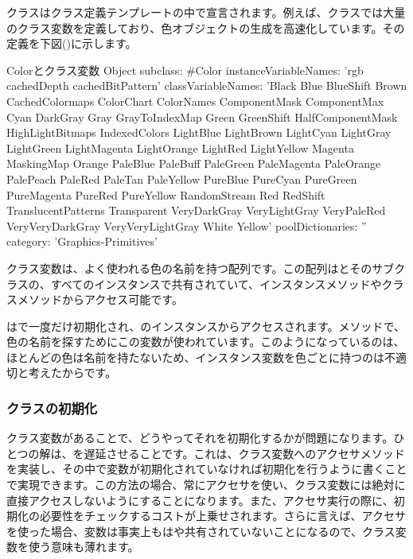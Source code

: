 \documentclass[a4paper,10pt,twoside]{book}
\begin{document}
クラスはクラス定義テンプレートの中で宣言されます。例えば、クラスでは大量のクラス変数を定義しており、色オブジェクトの生成を高速化しています。その定義を下図()に示します。
\begin{classdef}[Color]{Colorとクラス変数}
Object subclass: #Color 	
        instanceVariableNames: 'rgb cachedDepth cachedBitPattern'
        classVariableNames: 'Black Blue BlueShift Brown CachedColormaps ColorChart ColorNames ComponentMask ComponentMax Cyan DarkGray Gray GrayToIndexMap Green GreenShift HalfComponentMask HighLightBitmaps IndexedColors LightBlue LightBrown LightCyan LightGray LightGreen LightMagenta LightOrange LightRed LightYellow Magenta MaskingMap Orange PaleBlue PaleBuff PaleGreen PaleMagenta PaleOrange PalePeach PaleRed PaleTan PaleYellow PureBlue PureCyan PureGreen PureMagenta PureRed PureYellow RandomStream Red RedShift TranslucentPatterns Transparent VeryDarkGray VeryLightGray VeryPaleRed VeryVeryDarkGray VeryVeryLightGray White Yellow'
        poolDictionaries: '' 	
        category: 'Graphics-Primitives'
\end{classdef}

クラス変数は、よく使われる色の名前を持つ配列です。この配列はとそのサブクラスの、すべてのインスタンスで共有されていて、インスタンスメソッドやクラスメソッドからアクセス可能です。%

はで一度だけ初期化され、のインスタンスからアクセスされます。メソッドで、色の名前を探すためにこの変数が使われています。このようになっているのは、ほとんどの色は名前を持たないため、インスタンス変数を色ごとに持つのは不適切と考えたからです。

\subsubsection{クラスの初期化}

クラス変数があることで、どうやってそれを初期化するかが問題になります。ひとつの解は、を遅延させることです。これは、クラス変数へのアクセサメソッドを実装し、その中で変数が初期化されていなければ初期化を行うように書くことで実現できます。この方法の場合、常にアクセサを使い、クラス変数には絶対に直接アクセスしないようにすることになります。また、アクセサ実行の際に、初期化の必要性をチェックするコストが上乗せされます。さらに言えば、アクセサを使った場合、変数は事実上もはや共有されていないことになるので、クラス変数を使う意味も薄れます。
\end{document}

